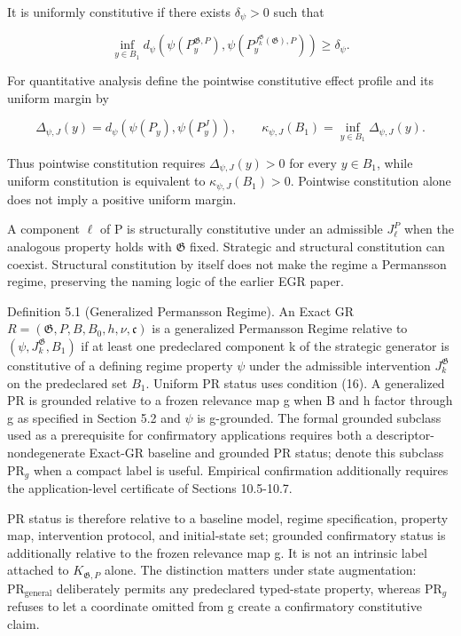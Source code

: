 \documentclass[10pt]{article}
\begin{document}
It is uniformly constitutive if there exists \(\delta_\psi>0\) such that

\begin{equation}
\inf_{y\in B_1} d_\psi\!\left(\psi(P_y^{\mathfrak G,P}),\psi(P_y^{J_k^{\mathfrak G}(\mathfrak G),P})\right)\ge\delta_\psi.
\tag{16}\label{eq:16}
\end{equation}

For quantitative analysis define the pointwise constitutive effect profile and its uniform margin by

\begin{equation}
\Delta_{\psi,J}(y)=d_\psi\!\left(\psi(P_y),\psi(P_y^J)\right),\qquad
\kappa_{\psi,J}(B_1)=\inf_{y\in B_1}\Delta_{\psi,J}(y).
\tag{16a}\label{eq:16a}
\end{equation}

Thus pointwise constitution requires \(\Delta_{\psi,J}(y)>0\) for every \(y\in B_1\), while uniform constitution is equivalent to \(\kappa_{\psi,J}(B_1)>0\). Pointwise constitution alone does not imply a positive uniform margin.


A component \(\ell\) of P is structurally constitutive under an
admissible \(J_\ell^P\) when the analogous property holds with
\(\mathfrak G\) fixed. Strategic and structural constitution can
coexist. Structural constitution by itself does not make the regime a
Permansson regime, preserving the naming logic of the earlier EGR paper.

Definition 5.1 (Generalized Permansson Regime). An Exact GR
\(R=(\mathfrak G,P,B,B_0,h,\nu,\mathfrak c)\) is a generalized
Permansson Regime relative to \((\psi,J_k^{\mathfrak G},B_1)\) if at
least one predeclared component k of the strategic generator is
constitutive of a defining regime property \(\psi\) under the admissible
intervention \(J_k^{\mathfrak G}\) on the predeclared set \(B_1\).
Uniform PR status uses condition (16). A generalized PR is grounded
relative to a frozen relevance map g when B and h factor through g as
specified in Section 5.2 and \(\psi\) is g-grounded. The formal grounded
subclass used as a prerequisite for confirmatory applications requires
both a descriptor-nondegenerate Exact-GR baseline and grounded PR
status; denote this subclass \(\mathrm{PR}_g\) when a compact label is
useful. Empirical confirmation additionally requires the
application-level certificate of Sections 10.5-10.7.

PR status is therefore relative to a baseline model, regime
specification, property map, intervention protocol, and initial-state
set; grounded confirmatory status is additionally relative to the frozen
relevance map g. It is not an intrinsic label attached to
\(K_{\mathfrak G,P}\) alone. The distinction matters under state
augmentation: \(\mathrm{PR}_{\mathrm{general}}\) deliberately permits
any predeclared typed-state property, whereas \(\mathrm{PR}_g\) refuses
to let a coordinate omitted from g create a confirmatory constitutive
claim.
\end{document}
